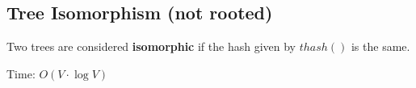 \subsection{Tree Isomorphism (not rooted)}

Two trees are considered \textbf{isomorphic} if the hash given by $thash()$ is the same.

Time: $O(V \cdot \log{V})$
